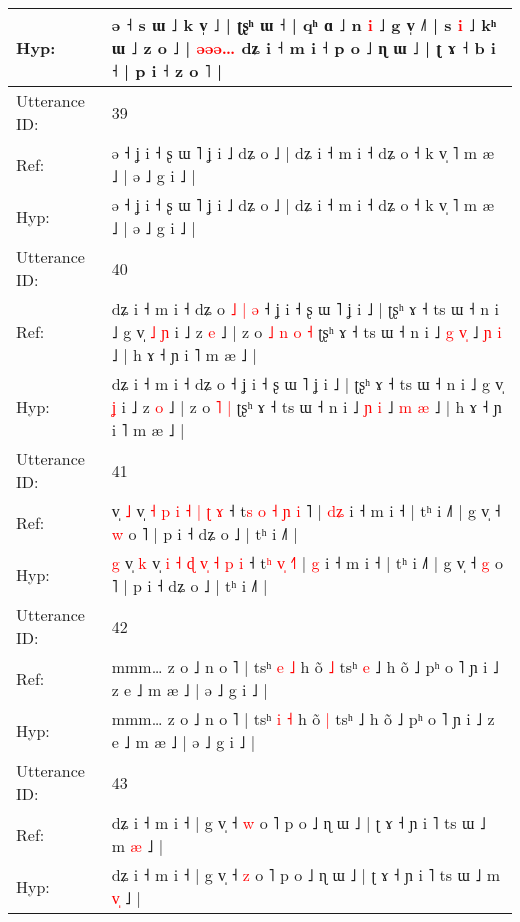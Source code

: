 \documentclass[10pt]{article}
\DeclareRobustCommand{\hl}[1]{{\textcolor{red}{#1}}}
\begin{document}
\begin{longtable}{ll}
 \\
Hyp: & ə ˧ s ɯ ˩ k v̩ ˩ | ʈʂʰ ɯ ˧ | qʰ ɑ ˩ n \hl{i} ˩ g v̩ ˩˥ | s \hl{i} ˩ kʰ ɯ ˩ z o ˩ | \hl{ə}\hl{ə}\hl{ə}\hl{…} dʑ i ˧ m i ˧ p o ˩ ɳ ɯ ˩ | ʈ ɤ ˧ b i ˧ | p i ˧ z o ˥ |
 \\
\midrule
Utterance ID: & 39 \\
Ref: & ə ˧ ʝ i ˧ ʂ ɯ ˥ ʝ i ˩ dʑ o ˩ | dʑ i ˧ m i ˧ dʑ o ˧ k v̩ ˥ m æ ˩ | ə ˩ g i ˩ |
 \\
Hyp: & ə ˧ ʝ i ˧ ʂ ɯ ˥ ʝ i ˩ dʑ o ˩ | dʑ i ˧ m i ˧ dʑ o ˧ k v̩ ˥ m æ ˩ | ə ˩ g i ˩ |
 \\
\midrule
Utterance ID: & 40 \\
Ref: & dʑ i ˧ m i ˧ dʑ o\hl{ }\hl{˩}\hl{ }\hl{|}\hl{ }\hl{ə} ˧ ʝ i ˧ ʂ ɯ ˥ ʝ i ˩ | ʈʂʰ ɤ ˧ ts ɯ ˧ n i ˩ g v̩\hl{ }\hl{˩} \hl{ɲ} i ˩ z \hl{e} ˩ | z o\hl{ }\hl{˩}\hl{ }\hl{n} \hl{o} \hl{˧} ʈʂʰ ɤ ˧ ts ɯ ˧ n i ˩ \hl{g} \hl{v}\hl{̩} ˩ \hl{ɲ} \hl{i} ˩ | h ɤ ˧ ɲ i ˥ m æ ˩ |
 \\
Hyp: & dʑ i ˧ m i ˧ dʑ o\hl{}\hl{}\hl{}\hl{}\hl{}\hl{} ˧ ʝ i ˧ ʂ ɯ ˥ ʝ i ˩ | ʈʂʰ ɤ ˧ ts ɯ ˧ n i ˩ g v̩\hl{}\hl{} \hl{ʝ} i ˩ z \hl{o} ˩ | z o\hl{}\hl{}\hl{}\hl{} \hl{˥} \hl{|} ʈʂʰ ɤ ˧ ts ɯ ˧ n i ˩ \hl{ɲ} \hl{}\hl{i} ˩ \hl{m} \hl{æ} ˩ | h ɤ ˧ ɲ i ˥ m æ ˩ |
 \\
\midrule
Utterance ID: & 41 \\
Ref: & \hl{}\hl{}v̩ \hl{˩} v̩ \hl{˧} \hl{p} \hl{i} \hl{}\hl{˧} \hl{|} \hl{ʈ} \hl{ɤ} ˧ t\hl{s}\hl{ }\hl{o} \hl{˧}\hl{ }\hl{ɲ} \hl{i}\hl{ }˥ | \hl{d}\hl{ʑ} i ˧ m i ˧ | tʰ i ˩˥ | g v̩ ˧ \hl{w} o ˥ | p i ˧ dʑ o ˩ | tʰ i ˩˥ |
 \\
Hyp: & \hl{g}\hl{ }v̩ \hl{k} v̩ \hl{i} \hl{˧} \hl{ɖ} \hl{v}\hl{̩} \hl{˧} \hl{p} \hl{i} ˧ t\hl{}\hl{}\hl{ʰ} \hl{}\hl{v}\hl{̩} \hl{}\hl{˧}˥ | \hl{}\hl{g} i ˧ m i ˧ | tʰ i ˩˥ | g v̩ ˧ \hl{g} o ˥ | p i ˧ dʑ o ˩ | tʰ i ˩˥ |
 \\
\midrule
Utterance ID: & 42 \\
Ref: & mmm… z o ˩ n o ˥ | tsʰ \hl{e} \hl{˩} h õ \hl{˩} tsʰ\hl{ }\hl{e} ˩ h õ ˩ pʰ o ˥ ɲ i ˩ z e ˩ m æ ˩ | ə ˩ g i ˩ |
 \\
Hyp: & mmm… z o ˩ n o ˥ | tsʰ \hl{i} \hl{˧} h õ \hl{|} tsʰ\hl{}\hl{} ˩ h õ ˩ pʰ o ˥ ɲ i ˩ z e ˩ m æ ˩ | ə ˩ g i ˩ |
 \\
\midrule
Utterance ID: & 43 \\
Ref: & dʑ i ˧ m i ˧ | g v̩ ˧ \hl{w} o ˥ p o ˩ ɳ ɯ ˩ | ʈ ɤ ˧ ɲ i ˥ ts ɯ ˩ m \hl{}\hl{æ} ˩ |
 \\
Hyp: & dʑ i ˧ m i ˧ | g v̩ ˧ \hl{z} o ˥ p o ˩ ɳ ɯ ˩ | ʈ ɤ ˧ ɲ i ˥ ts ɯ ˩ m \hl{v}\hl{̩} ˩ |
 \\

\end{longtable}
\end{document}
